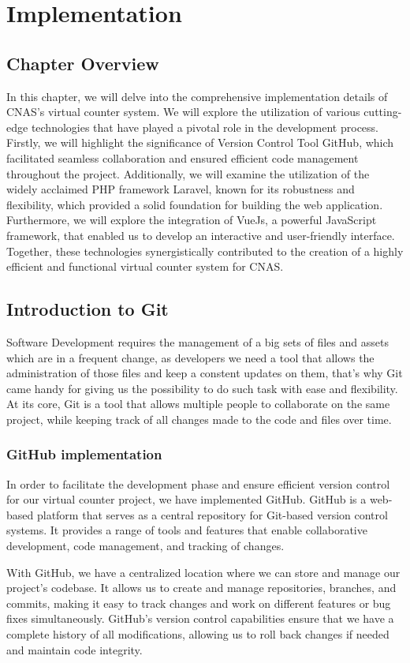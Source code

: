 \chapter{Implementation}
\section{Chapter Overview}
In this chapter, we will delve into the comprehensive implementation details of CNAS's virtual counter system. We will explore the utilization of various cutting-edge technologies that have played a pivotal role in the development process. Firstly, we will highlight the significance of Version Control Tool GitHub, which facilitated seamless collaboration and ensured efficient code management throughout the project. Additionally, we will examine the utilization of the widely acclaimed PHP framework Laravel, known for its robustness and flexibility, which provided a solid foundation for building the web application. Furthermore, we will explore the integration of VueJs, a powerful JavaScript framework, that enabled us to develop an interactive and user-friendly interface. Together, these technologies synergistically contributed to the creation of a highly efficient and functional virtual counter system for CNAS.
\section{Introduction to Git }
Software Development requires the management of a big sets of files and assets which are in a frequent change, as developers we need a tool that allows the administration of those files and keep a constent updates on them, that's why Git came handy for giving us the possibility to do such task with ease and flexibility. At its core, Git is a tool that allows multiple people to collaborate on the same project, while keeping track of all changes made to the code and files over time.
\subsection{GitHub implementation}
In order to facilitate the development phase and ensure efficient version control for our virtual counter project, we have implemented GitHub. GitHub is a web-based platform that serves as a central repository for Git-based version control systems. It provides a range of tools and features that enable collaborative development, code management, and tracking of changes.

With GitHub, we have a centralized location where we can store and manage our project's codebase. It allows us to create and manage repositories, branches, and commits, making it easy to track changes and work on different features or bug fixes simultaneously. GitHub's version control capabilities ensure that we have a complete history of all modifications, allowing us to roll back changes if needed and maintain code integrity.

